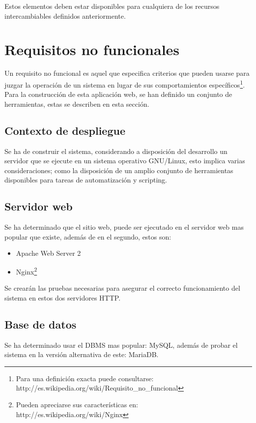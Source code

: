 Estos elementos deben estar disponibles para cualquiera de los recursos
intercambiables definidos anteriormente.

\section{Requisitos no funcionales}

Un requisito no funcional es aquel que especifica criterios que pueden usarse
para juzgar la operación de un sistema en lugar de sus comportamientos
específicos\footnote{Para una definición exacta puede consultarse:
http://es.wikipedia.org/wiki/Requisito\_no\_funcional}. Para la construcción de
esta aplicación web, se han definido un conjunto de herramientas, estas se
describen en esta sección.

\subsection{Contexto de despliegue}

Se ha de construir el sistema, considerando a disposición del desarrollo un
servidor que se ejecute en un sistema operativo GNU/Linux, esto implica varias
consideraciones; como la disposición de un amplio conjunto de
herramientas disponibles para tareas de automatización y scripting.

\subsection{Servidor web}

Se ha determinado que el sitio web, puede ser ejecutado en el servidor web mas
popular que existe, además de en el segundo, estos son:

\begin{itemize}
\item Apache Web Server 2
\item Nginx\footnote{Pueden apreciarse sus características en:
http://es.wikipedia.org/wiki/Nginx}
\end{itemize}

Se crearán las pruebas necesarias para asegurar el correcto funcionamiento del
sistema en estos dos servidores HTTP.

\subsection{Base de datos}

Se ha determinado usar el DBMS mas popular: MySQL, además de probar el sistema
en la versión alternativa de este: MariaDB.


